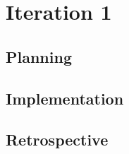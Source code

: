 \chapter{Iteration 1}
\label{it:1}
\section{Planning}

\section{Implementation}


\section{Retrospective}

